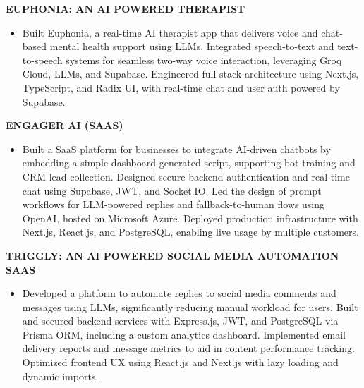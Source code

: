 \documentclass[letterpaper,10pt]{article}
\newcommand{\runsubsection}[1]{
  \color{subheadings}\fontsize{11pt}{13pt}\selectfont\bfseries\uppercase{#1}\normalfont
}
\newcommand{\descript}[1]{
  \color{subheadings}\raggedright\scshape\fontsize{10pt}{12pt}\selectfont{#1\\}\normalfont
}
\newenvironment{tightitemize}{
  \vspace{2pt}\begin{itemize}[leftmargin=12pt]\itemsep1pt \parskip0pt \parsep0pt
}{
  \end{itemize}\vspace{-\topsep}
}
\newcommand{\sectionsep}{\vspace{6pt}}
\begin{document}
\begin{minipage}[t]{0.66\textwidth}
\runsubsection{Euphonia: An AI Powered Therapist}

\descript{| Next.js, Supabase, LLM, AI, AWS, Groq Cloud, Radix UI, TypeScript, MS Azure}


\begin{tightitemize}
\item Built Euphonia, a real-time AI therapist app that delivers voice and chat-based mental health support using LLMs. Integrated speech-to-text and text-to-speech systems for seamless two-way voice interaction, leveraging Groq Cloud, LLMs, and Supabase. Engineered full-stack architecture using Next.js, TypeScript, and Radix UI, with real-time chat and user auth powered by Supabase.
\end{tightitemize}
\sectionsep

\runsubsection{Engager AI (SaaS)}

\descript{| React, Next.js, TypeScript, JavaScript, LLM, AI, OpenAI, Microsoft Azure, Socket.IO}


\begin{tightitemize}
\item Built a SaaS platform for businesses to integrate AI-driven chatbots by embedding a simple dashboard-generated script, supporting bot training and CRM lead collection. Designed secure backend authentication and real-time chat using Supabase, JWT, and Socket.IO. Led the design of prompt workflows for LLM-powered replies and fallback-to-human flows using OpenAI, hosted on Microsoft Azure. Deployed production infrastructure with Next.js, React.js, and PostgreSQL, enabling live usage by multiple customers.
\end{tightitemize}
\sectionsep

\runsubsection{Triggly: An AI Powered Social Media Automation SaaS}

\descript{| Next.js, PostgreSQL, Prisma, TypeScript, Node.js, Express.js}


\begin{tightitemize}
\item Developed a platform to automate replies to social media comments and messages using LLMs, significantly reducing manual workload for users. Built and secured backend services with Express.js, JWT, and PostgreSQL via Prisma ORM, including a custom analytics dashboard. Implemented email delivery reports and message metrics to aid in content performance tracking. Optimized frontend UX using React.js and Next.js with lazy loading and dynamic imports.
\end{tightitemize}
\sectionsep


\end{minipage}
\end{document}
